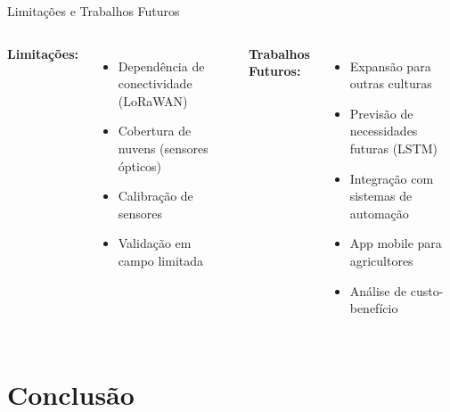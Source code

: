 \documentclass[aspectratio=169]{beamer}
\begin{document}
\begin{frame}{Limitações e Trabalhos Futuros}
  \begin{columns}
    \textbf{Limitações:}
    \begin{itemize}
      \item Dependência de conectividade (LoRaWAN)
      \item Cobertura de nuvens (sensores ópticos)
      \item Calibração de sensores
      \item Validação em campo limitada
    \end{itemize}
    
    \textbf{Trabalhos Futuros:}
    \begin{itemize}
      \item Expansão para outras culturas
      \item Previsão de necessidades futuras (LSTM)
      \item Integração com sistemas de automação
      \item App mobile para agricultores
      \item Análise de custo-benefício
    \end{itemize}
  \end{columns}
\end{frame}

\section{Conclusão}
\end{document}

